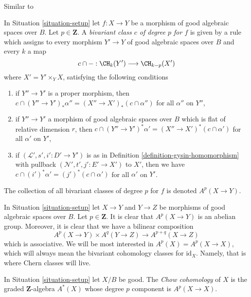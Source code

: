 \begin{definition}
\label{definition-bivariant-class}
\begin{reference}
Similar to \cite[Definition 17.1]{F}
\end{reference}
In Situation \ref{situation-setup} let $f : X \to Y$ be a morphism of
good algebraic spaces over $B$. Let $p \in \mathbf{Z}$.
A {\it bivariant class $c$ of degree $p$ for $f$} is given by a rule
which assigns to every morphism $Y' \to Y$ of good algebraic spaces over $B$
and every $k$ a map
$$
c \cap - : \CH_k(Y') \longrightarrow \CH_{k - p}(X')
$$
where $X' = Y' \times_Y X$, satisfying the following conditions
\begin{enumerate}
\item if $Y'' \to Y'$ is a proper morphism, then
$c \cap (Y'' \to Y')_*\alpha'' = (X'' \to X')_*(c \cap \alpha'')$
for all $\alpha''$ on $Y''$,
\item if $Y'' \to Y'$ a morphism of good algebraic spaces over $B$
which is flat of relative dimension $r$, then
$c \cap (Y'' \to Y')^*\alpha' = (X'' \to X')^*(c \cap \alpha')$
for all $\alpha'$ on $Y'$,
\item if $(\mathcal{L}', s', i' : D' \to Y')$ is as in
Definition \ref{definition-gysin-homomorphism}
with pullback $(\mathcal{N}', t', j' : E' \to X')$ to $X'$,
then we have $c \cap (i')^*\alpha' = (j')^*(c \cap \alpha')$
for all $\alpha'$ on $Y'$.
\end{enumerate}
The collection of all bivariant classes of degree $p$ for $f$ is
denoted $A^p(X \to Y)$.
\end{definition}

\noindent
In Situation \ref{situation-setup} let $X \to Y$ and $Y \to Z$
be morphisms of good algebraic spaces over $B$. Let $p \in \mathbf{Z}$.
It is clear that $A^p(X \to Y)$ is an abelian group.
Moreover, it is clear that we have a bilinear composition
$$
A^p(X \to Y) \times A^q(Y \to Z) \to A^{p + q}(X \to Z)
$$
which is associative.
We will be most interested in $A^p(X) = A^p(X \to X)$, which will always mean
the bivariant cohomology classes for $\text{id}_X$. Namely, that is where
Chern classes will live.

\begin{definition}
\label{definition-chow-cohomology}
In Situation \ref{situation-setup} let $X/B$ be good. The {\it Chow cohomology}
of $X$ is the graded $\mathbf{Z}$-algebra $A^*(X)$ whose degree
$p$ component is $A^p(X \to X)$.
\end{definition}

